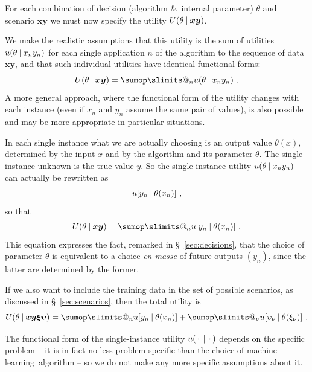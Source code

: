 \documentclass[\ifafour a4paper,12pt,\else a5paper,10pt,\fi%
onecolumn,oneside,article,%
british%
]{memoir}
\makeatletter
\theoremstyle{remark}
\theoremstyle{innote}
\def\sum{\DOTSI\sumop\slimits@}
\newcommand*{\amp}{\&}
\newcommand*{\dotv}{\mathord{\,\cdot\,}}%
\renewcommand*{\|}[1][]{\nonscript\:#1\vert\nonscript\:\mathopen{}}
\renewcommand*{\=}{\TextOrMath\texteq\eq}
\newcommand*{\sect}{\S}%
\newcommand*{\ml}{machine-learning}
\newcommand*{\yx}[1]{x_{#1}}
\newcommand*{\yy}[1]{y_{#1}}
\newcommand*{\bz}{\bm{xy}}
\newcommand*{\yxx}[1]{\xi_{#1}}
\newcommand*{\yyy}[1]{\upsilon_{#1}}
\newcommand*{\bzz}{\bm{\xi\upsilon}}
\makeatother
\begin{document}
For each combination of decision (algorithm \amp\ internal parameter)
$\theta$ and scenario $\bz$ we must now specify the utility
$U(\theta \| \bz)$.

We make the realistic assumptions that this utility is the sum of utilities
$u(\theta \| \yx{n}\yy{n})$ for each single application $n$ of the
algorithm to the sequence of data $\bz$, and that such individual utilities
have identical functional forms:
\begin{equation}
  \label{eq:total_utility}
  U(\theta \| \bz) = \sum_{n} u(\theta \| \yx{n}\yy{n}) \ .
\end{equation}
A more general approach, where the functional form of the utility changes
with each instance (even if $\yx{n}$ and $\yy{n}$ assume the same pair of
values), is also possible and may be more appropriate in particular
situations.

In each single instance what we are actually choosing is an output value
$\theta(x)$, determined by the input $x$ and by the algorithm and its
parameter $\theta$. The single-instance unknown is the true value $y$. So
the single-instance utility $u(\theta \| \yx{n}\yy{n})$ can actually be
rewritten as
\begin{equation}
  \label{eq:utility_singleinstance}
  u[\yy{n} \| \theta(\yx{n})] \ ,
\end{equation}
so that
\begin{equation}
  \label{eq:total_utility_final}
  U(\theta \| \bz) = \sum_{n} u[\yy{n} \| \theta(\yx{n})] \ .
\end{equation}
This equation expresses the fact, remarked in \sect~\ref{sec:decisions},
that the choice of parameter $\theta$ is equivalent to a choice \emph{en
  masse} of future outputs $(\yy{n})$, since the latter are determined by
the former.

If we also want to include the training data in the set of possible
scenarios, as discussed in \sect~\ref{sec:scenarios}, then the total
utility is
\begin{equation}
  \label{eq:total_utility_final_withtraining}
  U(\theta \| \bz\bzz) = \sum_{n} u[\yy{n} \| \theta(\yx{n})]
 +  \sum_{\nu} u[\yyy{\nu} \| \theta(\yxx{\nu})] \ .
\end{equation}

The functional form of the single-instance utility $u(\dotv\|\dotv)$
depends on the specific problem -- it is in fact no less problem-specific
than the choice of \ml\ algorithm -- so we do not make any more specific
assumptions about it.
\end{document}
